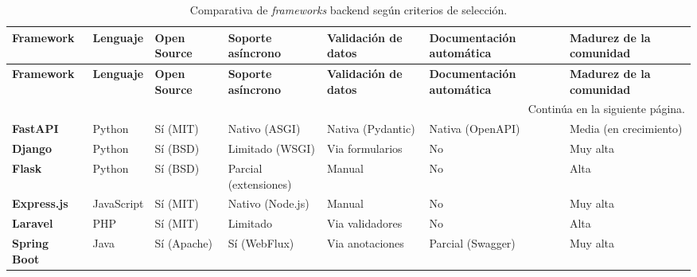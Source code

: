 \begin{center}
	\setlength{\tabcolsep}{4pt}
	\begin{longtable}{|p{2cm}|p{1.5cm}|p{1.3cm}|p{1.8cm}|p{1.8cm}|p{1.8cm}|p{2cm}|}
		\caption{Comparativa de \textit{frameworks} backend según criterios de selección.}
		\label{tab:frameworks-backend} \\
		
		\hline
		\small\textbf{Framework} &
		\small\textbf{Lenguaje} &
		\small\textbf{Open Source} &
		\small\textbf{Soporte asíncrono} &
		\small\textbf{Validación de datos} &
		\small\textbf{Documentación automática} &
		\small\textbf{Madurez de la comunidad} \\
		\hline
		\endfirsthead
		
		\hline
		\small\textbf{Framework} &
		\small\textbf{Lenguaje} &
		\small\textbf{Open Source} &
		\small\textbf{Soporte asíncrono} &
		\small\textbf{Validación de datos} &
		\small\textbf{Documentación automática} &
		\small\textbf{Madurez de la comunidad} \\
		\hline
		\endhead
		
		\hline
		\multicolumn{7}{r}{\small Continúa en la siguiente página.} \\
		\endfoot
		
		\hline
		\endlastfoot
		
		\small\textbf{FastAPI}~\cite{fastapi}
		& \small Python
		& \small Sí (MIT)
		& \small Nativo (ASGI)
		& \small Nativa (Pydantic)
		& \small Nativa (OpenAPI)
		& \small Media (en crecimiento) \\
		\hline
		
		\small\textbf{Django}~\cite{django}
		& \small Python
		& \small Sí (BSD)
		& \small Limitado (WSGI)
		& \small Via formularios
		& \small No
		& \small Muy alta \\
		\hline
		
		\small\textbf{Flask}~\cite{flask}
		& \small Python
		& \small Sí (BSD)
		& \small Parcial (extensiones)
		& \small Manual
		& \small No
		& \small Alta \\
		\hline
		
		\small\textbf{Express.js}~\cite{express}
		& \small JavaScript
		& \small Sí (MIT)
		& \small Nativo (Node.js)
		& \small Manual
		& \small No
		& \small Muy alta \\
		\hline
		
		\small\textbf{Laravel}~\cite{laravel}
		& \small PHP
		& \small Sí (MIT)
		& \small Limitado
		& \small Via validadores
		& \small No
		& \small Alta \\
		\hline
		
		\small\textbf{Spring Boot}~\cite{springboot}
		& \small Java
		& \small Sí (Apache)
		& \small Sí (WebFlux)
		& \small Via anotaciones
		& \small Parcial (Swagger)
		& \small Muy alta \\
		\hline
		
	\end{longtable}
\end{center}

